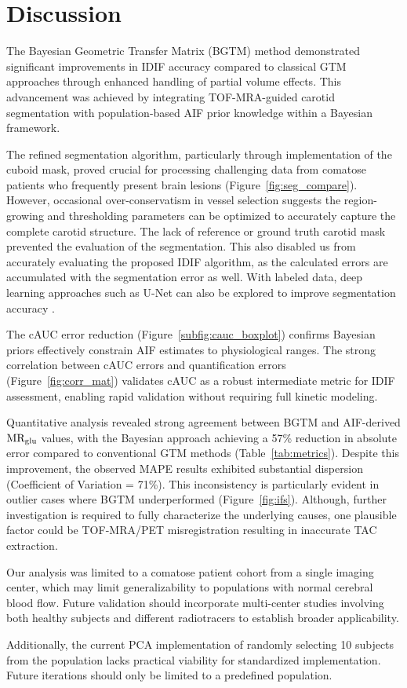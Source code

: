 \chapter{Discussion}
The Bayesian Geometric Transfer Matrix (BGTM) method demonstrated significant improvements in IDIF accuracy compared to classical GTM approaches through enhanced handling of partial volume effects.
This advancement was achieved by integrating TOF-MRA-guided carotid segmentation with population-based AIF prior knowledge within a Bayesian framework.

The refined segmentation algorithm, particularly through implementation of the cuboid mask, proved crucial for processing challenging data from comatose patients who frequently present brain lesions (Figure~\ref{fig:seg_compare}).
However, occasional over-conservatism in vessel selection suggests the region-growing and thresholding parameters can be optimized to accurately capture the complete carotid structure.
The lack of reference or ground truth carotid mask prevented the evaluation of the segmentation.
This also disabled us from accurately evaluating the proposed IDIF algorithm, as the calculated errors are accumulated with the segmentation error as well.
With labeled data, deep learning approaches such as U-Net can also be explored to improve segmentation accuracy \cite{ronneberger2015u}.


The cAUC error reduction (Figure~\ref{subfig:cauc_boxplot}) confirms Bayesian priors effectively constrain AIF estimates to physiological ranges.
The strong correlation between cAUC errors and quantification errors (Figure~\ref{fig:corr_mat}) validates cAUC as a robust intermediate metric for IDIF assessment, enabling rapid validation without requiring full kinetic modeling.

Quantitative analysis revealed strong agreement between BGTM and AIF-derived $\text{MR}_{\text{glu}}$ values, with the Bayesian approach achieving a 57\% reduction in absolute error compared to conventional GTM methods (Table~\ref{tab:metrics}).
Despite this improvement, the observed MAPE results exhibited substantial dispersion (Coefficient of Variation = 71\%).
This inconsistency is particularly evident in outlier cases where BGTM underperformed (Figure~\ref{fig:ifs}).
Although, further investigation is required to fully characterize the underlying causes, one plausible factor could be TOF-MRA/PET misregistration resulting in inaccurate TAC extraction.


Our analysis was limited to a comatose patient cohort from a single imaging center, which may limit generalizability to populations with normal cerebral blood flow.
Future validation should incorporate multi-center studies involving both healthy subjects and different radiotracers to establish broader applicability.

Additionally, the current PCA implementation of randomly selecting 10 subjects from the population lacks practical viability for standardized implementation.
Future iterations should only be limited to a predefined population.
